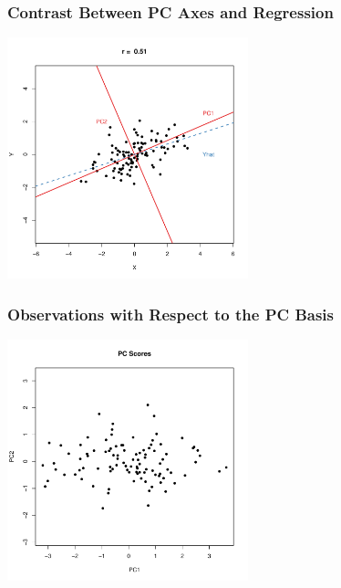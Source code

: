 \documentclass{beamer}
\begin{document}
\begin{frame}
  \frametitle{Contrast Between PC Axes and Regression}

\begin{center}
\includegraphics[height=2.75in]{fig-bivariate-pca-wreg.pdf}
\smallskip

\end{center}  

\end{frame}

\begin{frame}
  \frametitle{Observations with Respect to the PC Basis}

\begin{center}
\includegraphics[height=2.75in]{fig-bivariate-pca-scores.pdf}
\smallskip

\end{center}  

\end{frame}
\end{document}
